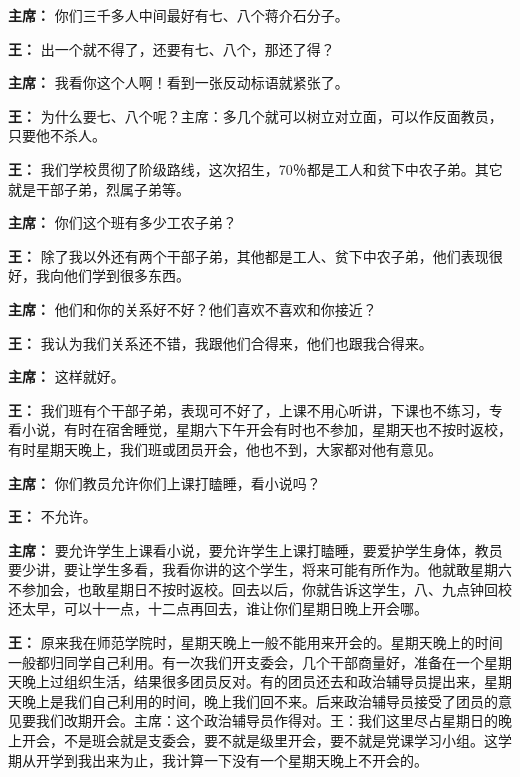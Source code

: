 \begin{list}{}
\item[\textbf{主席：}] 你们三千多人中间最好有七、八个蒋介石分子。

\item[\textbf{王：}] 出一个就不得了，还要有七、八个，那还了得？

\item[\textbf{主席：}] 我看你这个人啊！看到一张反动标语就紧张了。

\item[\textbf{王：}] 为什么要七、八个呢？主席：多几个就可以树立对立面，可以作反面教员，只要他不杀人。

\item[\textbf{王：}] 我们学校贯彻了阶级路线，这次招生，70％都是工人和贫下中农子弟。其它就是干部子弟，烈属子弟等。

\item[\textbf{主席：}] 你们这个班有多少工农子弟？

\item[\textbf{王：}] 除了我以外还有两个干部子弟，其他都是工人、贫下中农子弟，他们表现很好，我向他们学到很多东西。

\item[\textbf{主席：}] 他们和你的关系好不好？他们喜欢不喜欢和你接近？

\item[\textbf{王：}] 我认为我们关系还不错，我跟他们合得来，他们也跟我合得来。

\item[\textbf{主席：}] 这样就好。

\item[\textbf{王：}] 我们班有个干部子弟，表现可不好了，上课不用心听讲，下课也不练习，专看小说，有时在宿舍睡觉，星期六下午开会有时也不参加，星期天也不按时返校，有时星期天晚上，我们班或团员开会，他也不到，大家都对他有意见。

\item[\textbf{主席：}] 你们教员允许你们上课打瞌睡，看小说吗？

\item[\textbf{王：}] 不允许。

\item[\textbf{主席：}] 要允许学生上课看小说，要允许学生上课打瞌睡，要爱护学生身体，教员要少讲，要让学生多看，我看你讲的这个学生，将来可能有所作为。他就敢星期六不参加会，也敢星期日不按时返校。回去以后，你就告诉这学生，八、九点钟回校还太早，可以十一点，十二点再回去，谁让你们星期日晚上开会哪。

\item[\textbf{王：}] 原来我在师范学院时，星期天晚上一般不能用来开会的。星期天晚上的时间一般都归同学自己利用。有一次我们开支委会，几个干部商量好，准备在一个星期天晚上过组织生活，结果很多团员反对。有的团员还去和政治辅导员提出来，星期天晚上是我们自己利用的时间，晚上我们回不来。后来政治辅导员接受了团员的意见要我们改期开会。主席：这个政治辅导员作得对。王：我们这里尽占星期日的晚上开会，不是班会就是支委会，要不就是级里开会，要不就是党课学习小组。这学期从开学到我出来为止，我计算一下没有一个星期天晚上不开会的。


\end{list}
